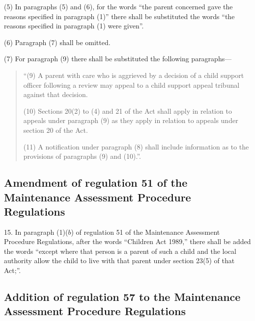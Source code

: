 \documentclass[12pt,a4paper]{article}
\begin{document}
(5) In paragraphs (5) and (6), for the words “the parent concerned gave the reasons specified in paragraph (1)” there shall be substituted the words “the reasons specified in paragraph (1) were given”.

(6) Paragraph (7) shall be omitted.

(7) For paragraph (9) there shall be substituted the following paragraphs---
\begin{quotation}
“(9) A parent with care who is aggrieved by a decision of a child support officer following a review may appeal to a child support appeal tribunal against that decision.

(10) Sections 20(2) to (4) and 21 of the Act shall apply in relation to appeals under paragraph (9) as they apply in relation to appeals under section 20 of the Act.

(11) A notification under paragraph (8) shall include information as to the provisions of paragraphs (9) and (10).”.
\end{quotation}

\subsection[15. Amendment of regulation 51 of the Maintenance Assessment Procedure Regulations]{Amendment of regulation 51 of the Maintenance Assessment Procedure Regulations}

15.  In paragraph (1)($b$) of regulation 51 of the Maintenance Assessment Procedure Regulations, after the words “Children Act 1989,” there shall be added the words “except where that person is a parent of such a child and the local authority allow the child to live with that parent under section 23(5) of that Act;”.

\subsection[16. Addition of regulation 57 to the Maintenance Assessment Procedure Regulations]{Addition of regulation 57 to the Maintenance Assessment Procedure Regulations}
\end{document}
